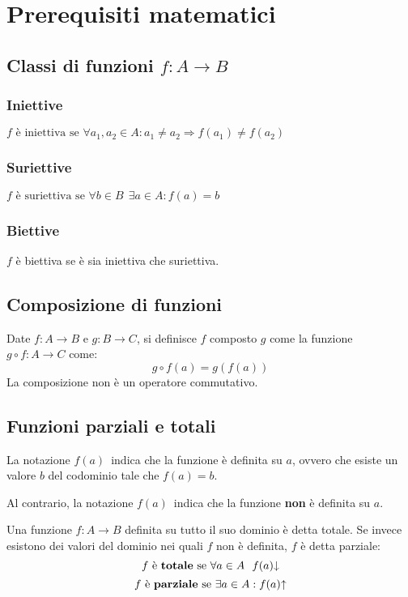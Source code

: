 
\section{Prerequisiti matematici}

\subsection*{Classi di funzioni $f:A\rightarrow B$}
\subsubsection*{Iniettive}
$ f \text{ è iniettiva se } \forall a_1,a_2 \in A: a_1\neq a_2
\Rightarrow f(a_1)\neq f(a_2) $
\subsubsection*{Suriettive}
$ f \text{ è suriettiva se } \forall b\in B \ \ \exists a\in A : f(a)=b $
\subsubsection*{Biettive}
$f$ è biettiva se è sia iniettiva che suriettiva.

\subsection*{Composizione di funzioni}
Date $f:A\rightarrow B$ e $g:B\rightarrow C$, si definisce $f$ composto $g$
come la funzione $g\circ f:A\rightarrow C$ come:
$$ g\circ f(a) = g(f(a)) $$
La composizione non è un operatore commutativo.

\subsection*{Funzioni parziali e totali}
La notazione $f(a)$\textdownarrow \ indica che la funzione è definita su $a$, ovvero
che esiste un valore $b$ del codominio tale che $f(a)=b$.

Al contrario, la notazione $f(a)$\textuparrow \ indica che la funzione \textbf{non} è
definita su $a$.

Una funzione $f:A\rightarrow B$ definita su tutto il suo dominio è detta totale. Se 
invece esistono dei valori del dominio nei quali $f$ non è definita, $f$ è detta 
parziale:
$$ f \text{ è \textbf{totale} se } \forall a\in A \ \ f(a)\text{\textdownarrow} $$
$$ f \text{ è \textbf{parziale} se } \exists a\in A : f(a)\text{\textuparrow} $$

